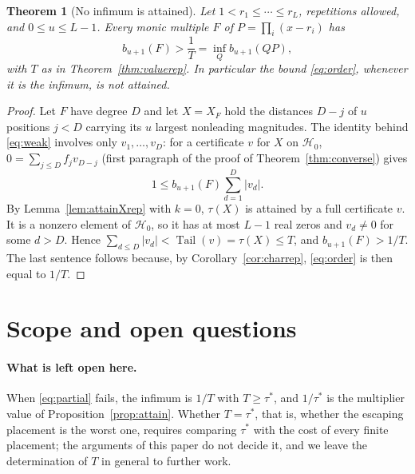 \documentclass[11pt]{article}
\newtheorem{theorem}{Theorem}[section]
\theoremstyle{definition}
\theoremstyle{plain}
\DeclareMathOperator{\Tail}{Tail}
\begin{document}
\begin{theorem}[No infimum is attained]\label{thm:noattain}
Let $1<r_1\le\cdots\le r_L$, repetitions allowed, and $0\le u\le L-1$.  Every
monic multiple $F$ of $P=\prod_i(x-r_i)$ has
\[
  b_{u+1}(F)>\frac1T=\inf_Qb_{u+1}(QP),
\]
with $T$ as in Theorem~\ref{thm:valuerep}.  In particular the
bound \eqref{eq:order}, whenever it is the infimum, is not attained.
\end{theorem}

\begin{proof}
Let $F$ have degree $D$ and let $X=X_F$ hold the distances $D-j$ of $u$
positions $j<D$ carrying its $u$ largest nonleading magnitudes.  The identity
behind \eqref{eq:weak} involves only $v_1,\ldots,v_D$: for a certificate $v$
for $X$ on $\mathcal H_0$, $0=\sum_{j\le D}f_jv_{D-j}$ (first paragraph of
the proof of Theorem~\ref{thm:converse}) gives
\[
  1\le b_{u+1}(F)\sum_{d=1}^{D}|v_d| .
\]
By Lemma~\ref{lem:attainXrep} with $k=0$, $\tau(X)$ is attained by a
full certificate $v$.  It is a nonzero element of $\mathcal H_0$, so it has
at most $L-1$ real zeros and $v_d\ne0$ for some $d>D$.  Hence
$\sum_{d\le D}|v_d|<\Tail(v)=\tau(X)\le T$, and $b_{u+1}(F)>1/T$.  The last
sentence follows because, by Corollary~\ref{cor:charrep}, \eqref{eq:order}
is then equal to $1/T$.
\end{proof}

\section{Scope and open questions}\label{sec:scope}

\paragraph{What is left open here.}  When \eqref{eq:partial} fails, the
infimum is $1/T$ with $T\ge\tau^*$, and $1/\tau^*$ is the multiplier value of
Proposition~\ref{prop:attain}.  Whether $T=\tau^*$, that is, whether the
escaping placement is the worst one, requires comparing $\tau^*$ with the
cost of every finite placement; the arguments of this paper do not decide
it, and we leave the determination of $T$ in general to further work.
\end{document}
